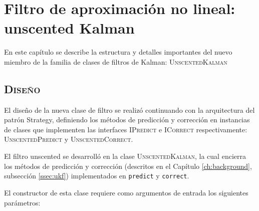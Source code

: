 \chapter{Filtro de aproximaci\'on no lineal: unscented Kalman}
\label{ch:news}
En este cap\'itulo se describe la estructura y detalles importantes del nuevo miembro de la familia de clases de filtros de Kalman: \textsc{UnscentedKalman}


\section{\textsc{Dise\~no}}
El dise\~no de la nueva clase de filtro se realiz\'o continuando con la arquitectura del patr\'on Strategy, definiendo los m\'etodos de predicci\'on y correcci\'on en instancias de clases que implementen las interfaces \textsc{IPredict} e \textsc{ICorrect} respectivamente: \textsc{UnscentedPredict} y \textsc{UnscentedCorrect}.
\bigskip

El filtro unscented se desarroll\'o en la clase \textsc{UnscentedKalman}, la cual encierra los m\'etodos de predicci\'on y correcci\'on (descritos en el Cap\'itulo \ref{ch:background}, subsecci\'on \ref{ssec:ukf}) implementados en \texttt{predict} y \texttt{correct}.
\bigskip

El constructor de esta clase requiere como argumentos de entrada los siguientes par\'ametros:

